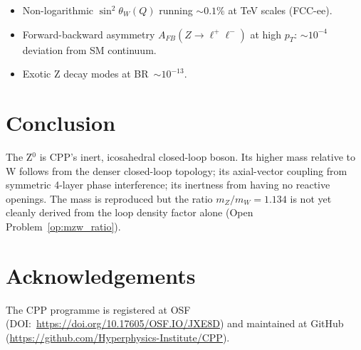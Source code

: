\documentclass[11pt,letterpaper]{article}
\begin{document}
\begin{itemize}
\item Non-logarithmic $\sin^2\theta_W(Q)$ running $\sim0.1\%$ at
  TeV scales (FCC-ee).
\item Forward-backward asymmetry $A_{FB}(Z\to\ell^+\ell^-)$ at high
  $p_T$: $\sim10^{-4}$ deviation from SM continuum.
\item Exotic Z decay modes at BR~$\sim10^{-13}$.
\end{itemize}

\section{Conclusion}

The Z$^0$ is CPP's inert, icosahedral closed-loop boson.  Its higher
mass relative to W follows from the denser closed-loop topology;
its axial-vector coupling from symmetric 4-layer phase interference;
its inertness from having no reactive openings.  The mass is
reproduced but the ratio $m_Z/m_W = 1.134$ is not yet cleanly derived
from the loop density factor alone (Open Problem~\ref{op:mzw_ratio}).





\section*{Acknowledgements}
The CPP programme is registered at OSF (DOI:~\url{https://doi.org/10.17605/OSF.IO/JXE8D}) and maintained at GitHub (\url{https://github.com/Hyperphysics-Institute/CPP}).
\end{document}
